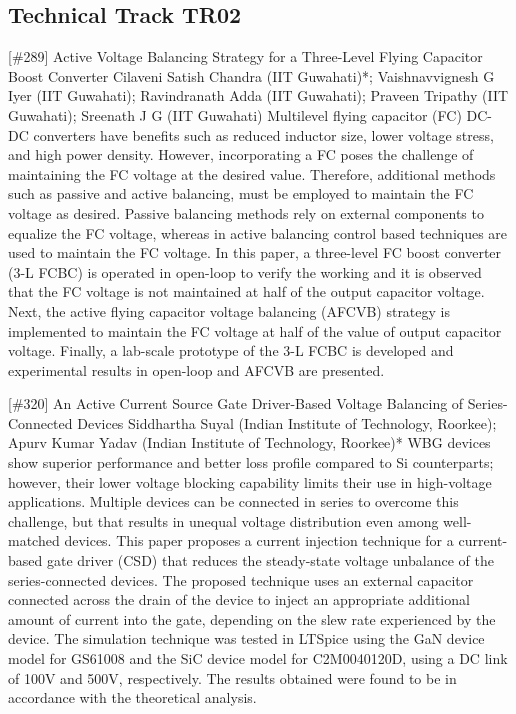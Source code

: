 \clearpage \subsection{Technical Track TR02}\nopagebreak {} \begin{abstract_online} {[\#289] Active Voltage Balancing Strategy for a  Three-Level Flying Capacitor Boost Converter} {} {Cilaveni Satish Chandra (IIT Guwahati)*; Vaishnavvignesh G Iyer (IIT Guwahati); Ravindranath Adda (IIT Guwahati); Praveen Tripathy (IIT Guwahati); Sreenath J G (IIT Guwahati)} {} Multilevel flying capacitor (FC) DC-DC converters have benefits such as reduced inductor size, lower voltage stress, and high power density. However, incorporating a FC poses the challenge of maintaining the FC voltage at the desired value. Therefore, additional methods such as passive and active balancing, must be employed to maintain the FC voltage as desired. Passive balancing methods rely on external components to equalize the FC voltage, whereas in active balancing control based techniques are used to maintain the FC voltage. In this paper, a three-level FC boost converter (3-L FCBC) is operated in open-loop to verify the working and it is observed that the FC voltage is not maintained at half of the output capacitor voltage. Next, the active flying capacitor voltage balancing (AFCVB) strategy is implemented to maintain the FC voltage at half of the value of output capacitor voltage. Finally, a lab-scale prototype of the 3-L FCBC is developed and experimental results in open-loop and AFCVB are presented. \end{abstract_online} 
{} \begin{abstract_online} {[\#320] An Active Current Source Gate Driver-Based  Voltage Balancing of Series-Connected Devices} {} {Siddhartha Suyal (Indian Institute of Technology, Roorkee); Apurv Kumar Yadav (Indian Institute of Technology, Roorkee)*} {} WBG devices show superior performance and better loss profile compared to Si counterparts; however, their lower voltage blocking capability limits their use in high-voltage applications. Multiple devices can be connected in series to overcome this challenge, but that results in unequal voltage distribution even among well-matched devices. This paper proposes a current injection technique for a current-based gate driver (CSD) that reduces the steady-state voltage unbalance of the series-connected devices. The proposed technique uses an external capacitor connected across the drain of the device to inject an appropriate additional amount of current into the gate, depending on the slew rate experienced by the device. The simulation technique was tested in LTSpice using the GaN device model for GS61008 and the SiC device model for C2M0040120D, using a DC link of 100V and 500V, respectively. The results obtained were found to be in accordance with the theoretical analysis.  \end{abstract_online} 
